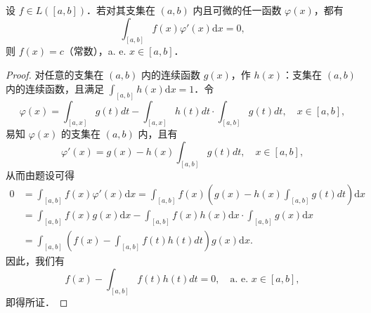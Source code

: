 \documentclass[../../main.tex]{subfiles}
\begin{document}
\begin{example}
设 \( f \in L([a,b]) \)．若对其支集在 \( (a,b) \) 内且可微的任一函数 \( \varphi(x) \)，都有
\[
\int_{[a,b]} f(x)\varphi'(x) \mathrm{d}x = 0,
\]
则 \( f(x) = c \)（常数），a. e. \( x \in [a,b] \)．
\end{example}
\begin{proof}
对任意的支集在 \( (a,b) \) 内的连续函数 \( g(x) \)，作 \( h(x) \)：支集在 \( (a,b) \) 内的连续函数，且满足 \( \int_{[a,b]} h(x) \mathrm{d}x = 1 \)．令
\[
\varphi(x) = \int_{[a,x]} g(t) dt - \int_{[a,x]} h(t) dt \cdot \int_{[a,b]} g(t) dt, \quad x \in [a,b],
\]
易知 \( \varphi(x) \) 的支集在 \( (a,b) \) 内，且有
\[
\varphi'(x) = g(x) - h(x)\int_{[a,b]} g(t) dt, \quad x \in [a,b],
\]
从而由题设可得
\begin{align*}
0 &= \int_{[a,b]} f(x)\varphi'(x) \mathrm{d}x = \int_{[a,b]} f(x)\left( g(x) - h(x)\int_{[a,b]} g(t) dt \right) \mathrm{d}x \\
&= \int_{[a,b]} f(x)g(x) \mathrm{d}x - \int_{[a,b]} f(x)h(x) \mathrm{d}x \cdot \int_{[a,b]} g(x) \mathrm{d}x \\
&= \int_{[a,b]} \left( f(x) - \int_{[a,b]} f(t)h(t) dt \right) g(x) \mathrm{d}x.
\end{align*}
因此，我们有
\[
f(x) - \int_{[a,b]} f(t)h(t) dt = 0, \quad \text{a. e. } x \in [a,b],
\]
即得所证．
\end{proof}
\end{document}
